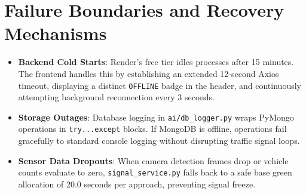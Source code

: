 \section{Failure Boundaries and Recovery Mechanisms}
\begin{itemize}[leftmargin=*]
    \item \textbf{Backend Cold Starts}: Render's free tier idles processes after 15 minutes. The frontend handles this by establishing an extended 12-second Axios timeout, displaying a distinct \texttt{OFFLINE} badge in the header, and continuously attempting background reconnection every 3 seconds.
    \item \textbf{Storage Outages}: Database logging in \texttt{ai/db\_logger.py} wraps PyMongo operations in \texttt{try...except} blocks. If MongoDB is offline, operations fail gracefully to standard console logging without disrupting traffic signal loops.
    \item \textbf{Sensor Data Dropouts}: When camera detection frames drop or vehicle counts evaluate to zero, \texttt{signal\_service.py} falls back to a safe base green allocation of 20.0 seconds per approach, preventing signal freeze.
\end{itemize}
